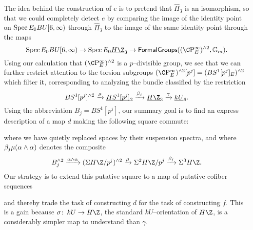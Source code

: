 The idea behind the construction of $e$ is to pretend that $\widehat \Pi_3$ is an isomorphism, so that we could completely detect $e$ by comparing the image of the identity point on $\operatorname{Spec} E_0 BU[6, \infty)$ through $\widehat \Pi_3$ to the image of the same identity point through the maps \[\Spec E_0 BU[6, \infty) \to \Spec E_0 \OS{H\Z}{3} \to \CatOf{FormalGroups}((\CP^\infty_E)^{\sm 2}, \Gm).\]  Using our calculation that $(\CP^\infty_E)^{\sm 2}$ is a $p$--divisible group, we see that we can further restrict attention to the torsion subgroups $(\CP^\infty_E)^{\sm 2}[p^j] = (BS^1[p^j]_E)^{\sm 2}$ which filter it, corresponding to analyzing the bundle classified by the restriction \[BS^1[p^j]^{\sm 2} \xrightarrow{\mu} \OS{HS^1[p^j]}{2} \xrightarrow{\beta_j} \OS{H\Z}{3} \xrightarrow{\gamma} \OS{kU}{6}.\]  Using the abbreviation $B_j = BS^1[p^j]$, our summary goal is to find an express description of a map $d$ making the following square commute:
\begin{center}
\end{center}
where we have quietly replaced spaces by their suspension spectra, and where $\beta_j \mu(\alpha \wedge \alpha)$ denotes the composite \[B_j^{\sm 2} \xrightarrow{\alpha \sm \alpha} (\Susp H\Z/p^j)^{\sm 2} \xrightarrow{\mu} \Susp^2 H\Z/p^j \xrightarrow{\beta_j} \Susp^3 H\Z.\]  Our strategy is to extend this putative square to a map of putative cofiber sequences
\begin{center}
\end{center}
and thereby trade the task of constructing $d$ for the task of constructing $f$.  This is a gain because $\sigma\co kU \to H\Z$, the standard $kU$--orientation of $H\Z$, is a considerably simpler map to understand than $\gamma$.

